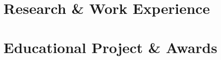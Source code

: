 \documentclass[letterpaper,11pt]{article}
\begin{document}
\compactHeadering
\compactEducation

\section{Research \& Work Experience}
\MetaPEBootcamper
\LabServerAndNetworkManager
\TeamLeadNetworkTeam
\PartTimeLinuxPC
\InternContainerPlatform

\section{Educational Project \& Awards}
\ProjectFGC
\NCTUCSCCIntranetInfrastructure
\SelectedAwards

\skills
\end{document}

